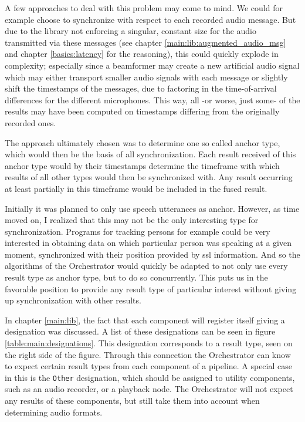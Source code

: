A few approaches to deal with this problem may come to mind.
We could for example choose to synchronize with respect to each recorded audio message.
But due to the library not enforcing a singular, constant size for the audio transmitted via these messages (see chapter \ref{main:lib:augmented_audio_msg} and chapter \ref{basics:latency} for the reasoning), this could quickly explode in complexity; especially since a beamformer may create a new artificial audio signal which may either transport smaller audio signals with each message or slightly shift the timestamps of the messages, due to factoring in the time-of-arrival differences for the different microphones.
This way, all -or worse, just some- of the results may have been computed on timestamps differing from the originally recorded ones.

The approach ultimately chosen was to determine one so called anchor type, which would then be the basis of all synchronization.
Each result received of this anchor type would by their timestamps determine the timeframe with which results of all other types would then be synchronized with.
Any result occurring at least partially in this timeframe would be included in the fused result.

Initially it was planned to only use speech utterances as anchor.
However, as time moved on, I realized that this may not be the only interesting type for synchronization.
Programs for tracking persons for example could be very interested in obtaining data on which particular person was speaking at a given moment, synchronized with their position provided by \gls{ssl} information.
And so the algorithms of the Orchestrator would quickly be adapted to not only use every result type as anchor type, but to do so concurrently.
This puts us in the favorable position to provide any result type of particular interest without giving up synchronization with other results.

In chapter \ref{main:lib}, the fact that each component will register itself giving a designation was discussed.
A list of these designations can be seen in figure \ref{table:main:designations}.
This designation corresponds to a result type, seen on the right side of the figure.
Through this connection the Orchestrator can know to expect certain result types from each component of a pipeline.
A special case in this is the \texttt{Other} designation, which should be assigned to utility components, such as an audio recorder, or a playback node.
The Orchestrator will not expect any results of these components, but still take them into account when determining audio formats.

